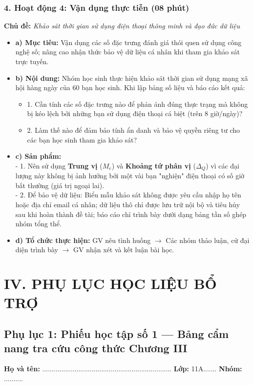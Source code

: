 \documentclass[12pt, a4paper]{article}
\begin{document}
\subsubsection*{4. Hoạt động 4: Vận dụng thực tiễn (08 phút)}
\textbf{Chủ đề:} \textit{Khảo sát thời gian sử dụng điện thoại thông minh và đạo đức dữ liệu}
\begin{itemize}
    \item \textbf{a) Mục tiêu:} Vận dụng các số đặc trưng đánh giá thói quen sử dụng công nghệ số; nâng cao nhận thức bảo vệ dữ liệu cá nhân khi tham gia khảo sát trực tuyến.
    \item \textbf{b) Nội dung:} Nhóm học sinh thực hiện khảo sát thời gian sử dụng mạng xã hội hàng ngày của $60$ bạn học sinh. Khi lập bảng số liệu và báo cáo kết quả:
    \begin{itemize}
        \item 1. Cần tính các số đặc trưng nào để phản ánh đúng thực trạng mà không bị kéo lệch bởi những bạn sử dụng điện thoại cá biệt (trên $8$ giờ/ngày)?
        \item 2. Làm thế nào để đảm bảo tính ẩn danh và bảo vệ quyền riêng tư cho các bạn học sinh tham gia khảo sát?
    \end{itemize}
    \item \textbf{c) Sản phẩm:}\\
    - 1. Nên sử dụng \textbf{Trung vị} ($M_e$) và \textbf{Khoảng tứ phân vị} ($\Delta_Q$) vì các đại lượng này không bị ảnh hưởng bởi một vài bạn "nghiện" điện thoại có số giờ bất thường (giá trị ngoại lai).\\
    - 2. Để bảo vệ dữ liệu: Biểu mẫu khảo sát không được yêu cầu nhập họ tên hoặc địa chỉ email cá nhân; dữ liệu thô chỉ được lưu trữ nội bộ và tiêu hủy sau khi hoàn thành đề tài; báo cáo chỉ trình bày dưới dạng bảng tần số ghép nhóm tổng thể.
    \item \textbf{d) Tổ chức thực hiện:} GV nêu tình huống $\to$ Các nhóm thảo luận, cử đại diện trình bày $\to$ GV nhận xét và kết luận bài học.
\end{itemize}

\newpage

\section*{IV. PHỤ LỤC HỌC LIỆU BỔ TRỢ}

\subsection*{Phụ lục 1: Phiếu học tập số 1 --- Bảng cẩm nang tra cứu công thức Chương III}
\noindent\textbf{Họ và tên:} .................................................................... \textbf{Lớp:} 11A....... \textbf{Nhóm:} ..........
\end{document}
